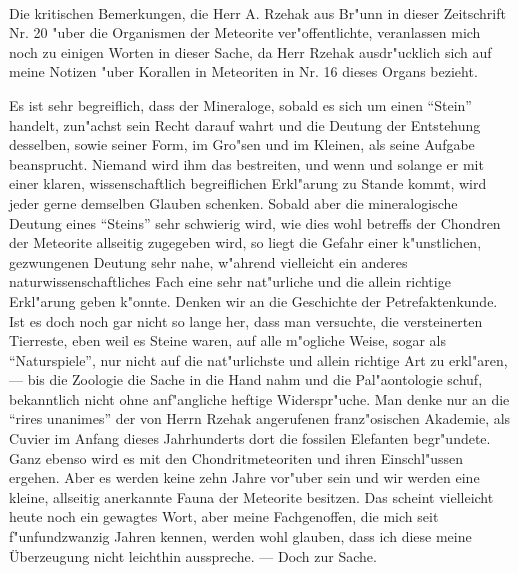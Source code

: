 \documentclass[a4paper, 12pt, oneside]{article}
\begin{document}
\paragraph{}
Die kritischen Bemerkungen, die Herr A. Rzehak aus Br"unn in dieser Zeitschrift Nr. 20 "uber die Organismen der Meteorite ver"offentlichte, veranlassen mich noch zu einigen Worten in dieser Sache, da Herr Rzehak ausdr"ucklich sich auf meine Notizen "uber Korallen in Meteoriten in Nr. 16 dieses Organs bezieht.

Es ist sehr begreiflich, dass der Mineraloge, sobald es sich um einen "`Stein"' handelt, zun"achst sein Recht darauf wahrt und die Deutung der Entstehung desselben, sowie seiner Form, im Gro"sen und im Kleinen, als seine Aufgabe beansprucht. Niemand wird ihm das bestreiten, und wenn und solange er mit einer klaren, wissenschaftlich begreiflichen Erkl"arung zu Stande kommt, wird jeder gerne demselben Glauben schenken. Sobald aber die mineralogische Deutung eines "`Steins"' sehr schwierig wird, wie dies wohl betreffs der Chondren der Meteorite allseitig zugegeben wird, so liegt die Gefahr einer k"unstlichen, gezwungenen Deutung sehr nahe, w"ahrend vielleicht ein anderes naturwissenschaftliches Fach eine sehr nat"urliche und die allein richtige Erkl"arung geben k"onnte. Denken wir an die Geschichte der Petrefaktenkunde. Ist es doch noch gar nicht so lange her, dass man versuchte, die versteinerten Tierreste, eben weil es Steine waren, auf alle m"ogliche Weise, sogar als "`Naturspiele"', nur nicht auf die nat"urlichste und allein richtige Art zu erkl"aren, --- bis die Zoologie die Sache in die Hand nahm und die Pal"aontologie schuf, bekanntlich nicht ohne anf"angliche heftige Widerspr"uche. Man denke nur an die "`rires unanimes"' der von Herrn Rzehak angerufenen franz"osischen Akademie, als Cuvier im Anfang dieses Jahrhunderts dort die fossilen Elefanten begr"undete. Ganz ebenso wird es mit den Chondritmeteoriten und ihren Einschl"ussen ergehen. Aber es werden keine zehn Jahre vor"uber sein und wir werden eine kleine, allseitig anerkannte Fauna der Meteorite besitzen. Das scheint vielleicht heute noch ein gewagtes Wort, aber meine Fachgenoffen, die mich seit f"unfundzwanzig Jahren kennen, werden wohl glauben, dass ich diese meine Überzeugung nicht leichthin ausspreche. --- Doch zur Sache.
\end{document}
